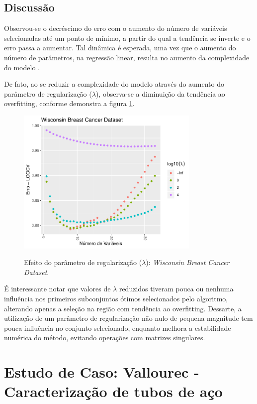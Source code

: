 \subsection{Discussão}

Observou-se o decréscimo do erro com o aumento do número de variáveis selecionadas até um ponto de mínimo, a partir do qual a tendência se inverte e o erro passa a aumentar. Tal dinâmica é esperada, uma vez que o aumento do número de parâmetros, na regressão linear, resulta no aumento da complexidade do modelo \cite[p. 224]{statistical_learning}. 

De fato, ao se reduzir a complexidade do modelo através do aumento do parâmetro de regularização ($\lambda$), observa-se a diminuição da tendência ao overfitting, conforme demonstra a figura \ref{fig:lambda_WisconsinBreastCancer}.

\begin{figure}[!htb]
    \centering
    \caption{Efeito do parâmetro de regularização ($\lambda$): \textit{Wisconsin Breast Cancer Dataset}.}
    \includegraphics[height=200pt]{imgs/res/WisconsinBreastCancerDataset_lambda}
    \label{fig:lambda_WisconsinBreastCancer}
\end{figure}

É interessante notar que valores de $\lambda$ reduzidos tiveram pouca ou nenhuma influência nos primeiros subconjuntos ótimos selecionados pelo algoritmo, alterando apenas a seleção na região com tendência ao overfitting. Dessarte, a utilização de um parâmetro de regularização não nulo de pequena magnitude tem pouca influência no conjunto selecionado, enquanto melhora a estabilidade numérica do método, evitando operações com matrizes singulares.

\section{Estudo de Caso: Vallourec - Caracterização de tubos de aço}
